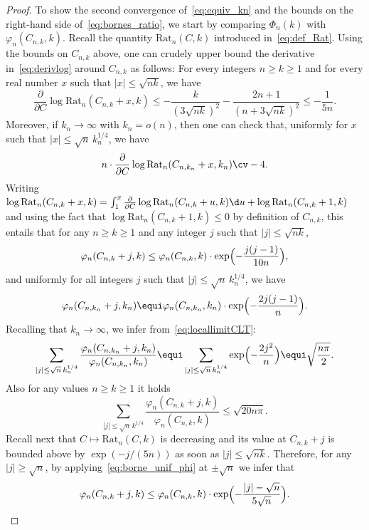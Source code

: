 \begin{proof}
To show the second convergence of~\eqref{eq:equiv_kn} and the bounds on the right-hand side of~\eqref{eq:bornes_ratio}, we start by comparing $\Phi_n(k)$ with $\varphi_{n}(C_{n,k},k)$.
Recall the quantity $\mathrm{Rat}_{n}(C,k)$ introduced in~\eqref{eq:def_Rat}.
Using the bounds on $C_{n,k}$ above, one can crudely upper bound the derivative in~\eqref{eq:derivlog} around $C_{n,k}$ as follows: For every integers $n \ge k \ge 1$ and for every real number $x$ such that $|x| \le \sqrt{nk}$, we have
\[
\frac{\partial}{\partial C} \log \mathrm{Rat}_n(C_{n,k}+x,k)
\le - \frac{k}{(3\sqrt{nk})^2}- \frac{2n+1}{(n+3\sqrt{nk})^2}
\le - \frac{1}{5n}.
\]
Moreover, if $k_n \to\infty$ with $k_n = o(n)$, then
one can check that, uniformly for $x$ such that $|x| \leq \sqrt{n}\, k_{n}^{1/4}$, we have
\[
n \cdot \frac{\partial}{\partial C} \log \mathrm{Rat}_n(C_{n,k_{n}}+x,k_{n}) \cv -4.
\]
Writing $ \log \mathrm{Rat}_n(C_{n,k}+x,k) = \int_{1}^{x} \frac{\partial}{\partial C} \log \mathrm{Rat}_n(C_{n,k}+u,k) \d u+\log \mathrm{Rat}_n(C_{n,k}+1,k)$ and using the fact that $\log \mathrm{Rat}_n(C_{n,k}+1,k) \leq 0$ by definition of $C_{n,k}$,
this entails that for any $n \ge k \ge 1$ and any integer $j$ such that $|j| \le \sqrt{nk}$,
\begin{equation} \label{eq:borne_unif_phi}
\varphi_{n}(C_{n,k}+j,k) \le \varphi_{n}(C_{n,k},k) \cdot \exp\Bigl(- \frac{j(j-1)}{10n}\Bigr),
\end{equation}
and uniformly for all integers $j$ such that $|j| \leq \sqrt{n}\, k_{n}^{1/4}$, we have
\begin{equation}\label{eq:locallimitCLT}
\varphi_{n}(C_{n,k_{n}}+j,k_{n}) \equi \varphi_{n}(C_{n,k_{n}},k_{n}) \cdot \exp\Bigl(-\frac{2j(j-1)}{n}\Bigr).
\end{equation}
Recalling that $k_{n} \to \infty$, we infer from~\eqref{eq:locallimitCLT}:
\[
\sum_{|j| \leq \sqrt{n}\,k_{n}^{1/4}} \frac{\varphi_{n}(C_{n,k_{n}}+j,k_{n})}{\varphi_{n}(C_{n,k_{n}},k_{n})}
\equi \sum_{|j| \leq \sqrt{n}\,k_{n}^{1/4}} \exp\Bigl(- \frac{2j^2}{n}\Bigr)
\equi \sqrt{\frac{n \pi}{2}}.
\]
Also for any values $n \ge k \ge 1$ it holds
\[
\sum_{|j| \leq \sqrt{n}\,k^{1/4}} \frac{\varphi_{n}(C_{n,k}+j,k)}{\varphi_{n}(C_{n,k},k)}
\le \sqrt{20 n \pi}.
\]
Recall next that $ C \mapsto \mathrm{Rat}_n(C,k)$ is decreasing and its value at $C_{n,k}+j$ is bounded above by $\exp(-j/(5n))$ as soon as $|j| \le \sqrt{nk}$. Therefore, for any $|j| \ge\sqrt{n}$, by applying~\eqref{eq:borne_unif_phi} at $\pm\sqrt{n}$ we infer that
\[
\varphi_{n}(C_{n,k}+j,k) \le \varphi_{n}(C_{n,k},k) \cdot \exp\Bigl(- \frac{|j|-\sqrt{n}}{5\sqrt{n}}\Bigr).
\]
\end{proof}
